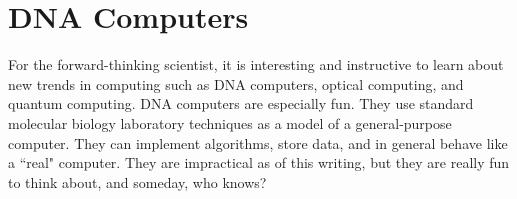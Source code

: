 \section{DNA Computers}
For the forward-thinking scientist, it is interesting and instructive to learn about new trends in computing such as DNA computers, optical computing, and quantum computing. DNA computers are especially fun. They use standard molecular biology laboratory techniques as a model of a general-purpose computer. They can implement algorithms, store data, and in general behave like a ``real" computer. They are impractical as of this writing, but they are really fun to think about, and someday, who knows?
